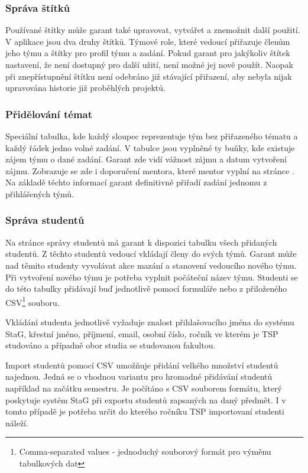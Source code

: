 \documentclass[czech,BP]{thesiskiv}
\begin{document}
			\subsubsection{Správa štítků}
			\par Používané štítky může garant také upravovat, vytvářet a znemožnit další použití. V aplikace jsou dva druhy štítků. Týmové role, které vedoucí přiřazuje členům jeho týmu a štítky pro profil týmu a zadání. Pokud garant pro jakýkoliv štítek nastavení, že není dostupný pro další užití, není možné jej nově použít. Naopak při znepřístupnění štítku není odebráno již stávající přiřazení, aby nebyla nijak upravována historie již proběhlých projektů.
			\subsubsection{Přidělování témat}
			\par Speciální tabulka, kde každý sloupec reprezentuje tým bez přiřazeného tématu a každý řádek jedno volné zadání. V tabulce jsou vyplněné ty buňky, kde existuje zájem týmu o dané zadání. Garant zde vidí vážnost zájmu a datum vytvoření zájmu. Zobrazuje se zde i doporučení mentora, které mentor vyplní na stránce . Na základě těchto informací garant definitivně přiřadí zadání jednomu z přihlášených týmů.
			\subsubsection{Správa studentů}
			\par Na stránce správy studentů má garant k dispozici tabulku všech přidaných studentů. Z těchto studentů vedoucí vkládají členy do svých týmů. Garant může nad těmito studenty vyvolávat akce mazání a stanovení vedoucího nového týmu. Při vytvoření nového týmu je potřeba vyplnit počáteční název týmu. Studenti se do této tabulky přidávají buď jednotlivě pomocí formuláře nebo z přiloženého CSV\footnote{Comma-separated values - jednoduchý souborový formát pro výměnu tabulkových dat} souboru.
			\par Vkládání studenta jednotlivě vyžaduje znalost přihlašovacího jména do systému StaG, křestní jméno, příjmení, email, osobní číslo, ročník ve kterém je TSP studováno a případně obor studia se studovanou fakultou.
			\par Import studentů pomocí CSV umožňuje přidání velkého množství studentů najednou. Jedná se o vhodnou variantu pro hromadné přidávání studentů například na začátku semestru. Je počítáno s CSV souborem formátu, který poskytuje systém StaG při exportu studentů zapsaných na daný předmět. I v tomto případě je potřeba určit do kterého ročníku TSP importovaní studenti náleží.
\end{document}
